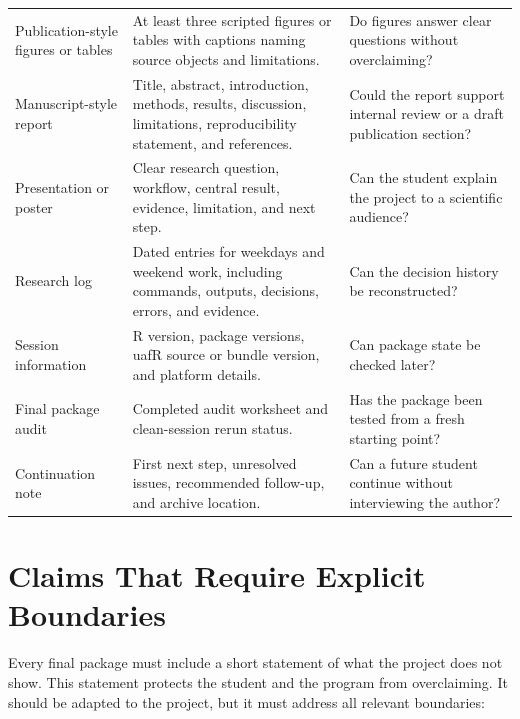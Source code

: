 \begin{longtable}{p{}p{}p{}}
Publication-style figures or tables & At least three scripted figures or tables with captions naming source objects and limitations. & Do figures answer clear questions without overclaiming?\\
Manuscript-style report & Title, abstract, introduction, methods, results, discussion, limitations, reproducibility statement, and references. & Could the report support internal review or a draft publication section?\\
Presentation or poster & Clear research question, workflow, central result, evidence, limitation, and next step. & Can the student explain the project to a scientific audience?\\
Research log & Dated entries for weekdays and weekend work, including commands, outputs, decisions, errors, and evidence. & Can the decision history be reconstructed?\\
Session information & R version, package versions, uafR source or bundle version, and platform details. & Can package state be checked later?\\
Final package audit & Completed audit worksheet and clean-session rerun status. & Has the package been tested from a fresh starting point?\\
Continuation note & First next step, unresolved issues, recommended follow-up, and archive location. & Can a future student continue without interviewing the author?\\
\bottomrule
\end{longtable}

\section{Claims That Require Explicit Boundaries}
Every final package must include a short statement of what the project does not show. This statement protects the student and the program from overclaiming. It should be adapted to the project, but it must address all relevant boundaries:

